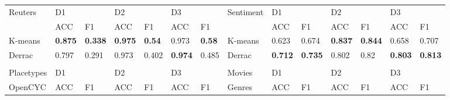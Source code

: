 \begin{landscape}
	\begin{table}[]
		\footnotesize
		\begin{tabular}{llllllllllllll}
		Reuters     & D1                              &                                 & D2                              &                                 & D3                              &                                 & Sentiment                      & D1                              &                                 & D2                              &                                 & D3                              &                                             \\
& ACC                             & F1                              & ACC                             & F1                              & ACC                             & F1                              &                                & ACC                             & F1                              & ACC                             & F1                              & ACC                             & F1                                    \\
\toprule
K-means     & \textbf{0.875} & \textbf{0.338} & \textbf{0.975} & \textbf{0.54}  & 0.973                           & \textbf{0.58}  & K-means                        & 0.623                           & 0.674                           & \textbf{0.837} & \textbf{0.844} & 0.658                           & 0.707                                   \\
\midrule
Derrac      & 0.797                           & 0.291                           & 0.973                           & 0.402                           & \textbf{0.974} & 0.485                           & Derrac                         & \textbf{0.712} & \textbf{0.735} & 0.802                           & 0.82                            & \textbf{0.803} & \textbf{0.813}            \\
&&&&&&\\
Placetypes  & D1                              &                                 & D2                              &                                 & D3                              &                                 & Movies                         & D1                              &                                 & D2                              &                                 & D3                              &                          \\
OpenCYC     & ACC                             & F1                              & ACC                             & F1                              & ACC                             & F1                              & Genres                         & ACC                             & F1                              & ACC                             & F1                              & ACC                             & F1                                         \\

\end{tabular}
\end{table}
\end{landscape}
